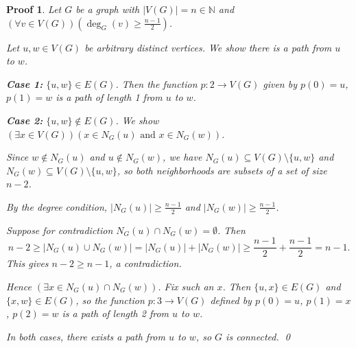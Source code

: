 \documentclass[12pt]{article}
\newcommand{\N}{\mathbb{N}}
\theoremstyle{proofstyle}
\newtheorem*{proof*}{Proof}
\begin{document}
\begin{enumerate}[left=0pt, itemsep=2em, parsep=1em]
\begin{proof*}

Let $G$ be a graph with $|V(G)| = n \in \N$ and
$(\forall v \in V(G))\!\left(\deg_G(v) \geq \frac{n-1}{2}\right)$.

Let $u, w \in V(G)$ be arbitrary distinct vertices. We show there is a path from $u$ to $w$.

\textbf{Case 1:} $\{u, w\} \in E(G)$. Then the function $p : 2 \to V(G)$ given by
$p(0) = u$, $p(1) = w$ is a path of length 1 from $u$ to $w$.

\textbf{Case 2:} $\{u, w\} \notin E(G)$. We show
$(\exists x \in V(G))(x \in N_G(u) \text{ and } x \in N_G(w))$.

Since $w \notin N_G(u)$ and $u \notin N_G(w)$, we have $N_G(u) \subseteq V(G) \setminus \{u, w\}$
and $N_G(w) \subseteq V(G) \setminus \{u, w\}$, so both neighborhoods are subsets of a set
of size $n - 2$.

By the degree condition,
$|N_G(u)| \geq \frac{n-1}{2}$ and $|N_G(w)| \geq \frac{n-1}{2}$.

Suppose for contradiction $N_G(u) \cap N_G(w) = \emptyset$. Then
\[
  n - 2 \geq |N_G(u) \cup N_G(w)| = |N_G(u)| + |N_G(w)| \geq \frac{n-1}{2} + \frac{n-1}{2} = n - 1.
\]
This gives $n - 2 \geq n - 1$, a contradiction.

Hence $(\exists x \in N_G(u) \cap N_G(w))$. Fix such an $x$. Then
$\{u, x\} \in E(G)$ and $\{x, w\} \in E(G)$, so the function $p : 3 \to V(G)$ defined by
$p(0) = u$, $p(1) = x$, $p(2) = w$ is a path of length 2 from $u$ to $w$.

In both cases, there exists a path from $u$ to $w$, so $G$ is connected. \qed

\end{proof*}

\end{enumerate}
\end{document}
